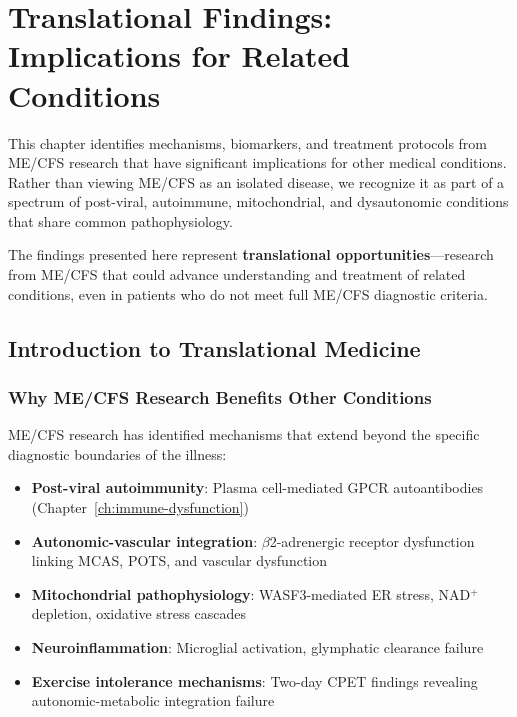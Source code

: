 \chapter{Translational Findings: Implications for Related Conditions}
\label{ch:translational-findings}

This chapter identifies mechanisms, biomarkers, and treatment protocols from ME/CFS research that have significant implications for other medical conditions. Rather than viewing ME/CFS as an isolated disease, we recognize it as part of a spectrum of post-viral, autoimmune, mitochondrial, and dysautonomic conditions that share common pathophysiology.

The findings presented here represent \textbf{translational opportunities}---research from ME/CFS that could advance understanding and treatment of related conditions, even in patients who do not meet full ME/CFS diagnostic criteria.

\section{Introduction to Translational Medicine}
\label{sec:translational-intro}

\subsection{Why ME/CFS Research Benefits Other Conditions}

ME/CFS research has identified mechanisms that extend beyond the specific diagnostic boundaries of the illness:

\begin{itemize}
    \item \textbf{Post-viral autoimmunity}: Plasma cell-mediated GPCR autoantibodies (Chapter~\ref{ch:immune-dysfunction})
    \item \textbf{Autonomic-vascular integration}: $\beta$2-adrenergic receptor dysfunction linking MCAS, POTS, and vascular dysfunction
    \item \textbf{Mitochondrial pathophysiology}: WASF3-mediated ER stress, NAD$^+$ depletion, oxidative stress cascades
    \item \textbf{Neuroinflammation}: Microglial activation, glymphatic clearance failure
    \item \textbf{Exercise intolerance mechanisms}: Two-day CPET findings revealing autonomic-metabolic integration failure
\end{itemize}

